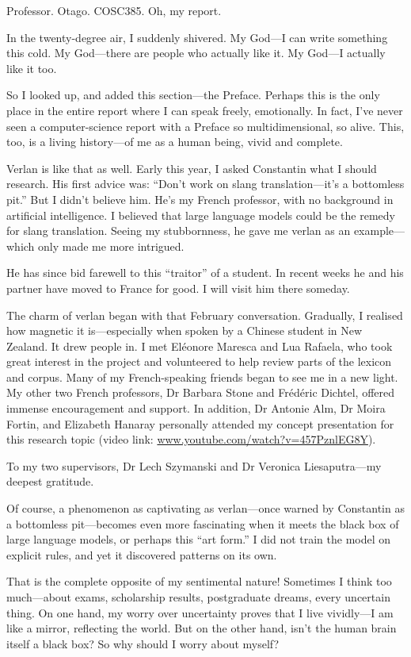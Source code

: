 \documentclass[12pt]{article}
\begin{document}
Professor. Otago. COSC385. Oh, my report.

In the twenty-degree air, I suddenly shivered. My God\;---\;I can write something this cold.
My God\;---\;there are people who actually like it.
My God\;---\;I actually like it too.

So I looked up, and added this section\;---\;the Preface.
Perhaps this is the only place in the entire report where I can speak freely, emotionally.
In fact, I've never seen a computer-science report with a Preface so multidimensional, so alive. This, too, is a living history\;---\;of me as a human being, vivid and complete.

Verlan is like that as well. Early this year, I asked Constantin what I should research. His first advice was: ``Don't work on slang translation\;---\;it's a bottomless pit.'' But I didn't believe him. He's my French professor, with no background in artificial intelligence. I believed that large language models could be the remedy for slang translation. Seeing my stubbornness, he gave me verlan as an example\;---\;which only made me more intrigued.

He has since bid farewell to this ``traitor'' of a student. In recent weeks he and his partner have moved to France for good. I will visit him there someday.

The charm of verlan began with that February conversation. Gradually, I realised how magnetic it is\;---\;especially when spoken by a Chinese student in New Zealand. It drew people in. I met Eléonore Maresca and Lua Rafaela, who took great interest in the project and volunteered to help review parts of the lexicon and corpus. Many of my French-speaking friends began to see me in a new light. My other two French professors, Dr Barbara Stone and Frédéric Dichtel, offered immense encouragement and support. In addition, Dr Antonie Alm, Dr Moira Fortin, and Elizabeth Hanaray personally attended my concept presentation for this research topic (video link: \url{www.youtube.com/watch?v=457PznlEG8Y}).

To my two supervisors, Dr Lech Szymanski and Dr Veronica Liesaputra\;---\;my deepest gratitude.

Of course, a phenomenon as captivating as verlan\;---\;once warned by Constantin as a bottomless pit\;---\;becomes even more fascinating when it meets the black box of large language models, or perhaps this ``art form.'' I did not train the model on explicit rules, and yet it discovered patterns on its own.

That is the complete opposite of my sentimental nature!
Sometimes I think too much\;---\;about exams, scholarship results, postgraduate dreams, every uncertain thing. On one hand, my worry over uncertainty proves that I live vividly\;---\;I am like a mirror, reflecting the world. But on the other hand, isn't the human brain itself a black box?
So why should I worry about myself?
\end{document}
